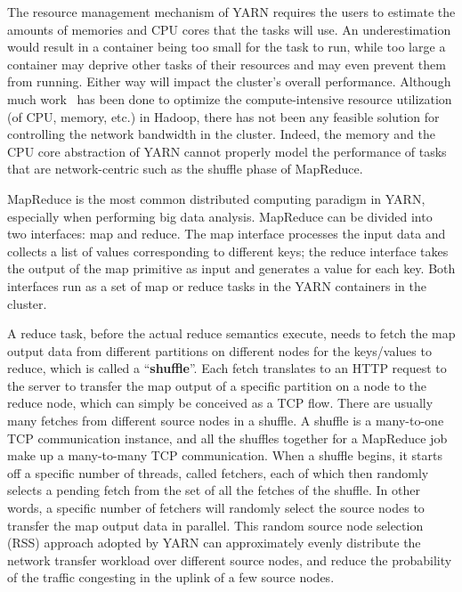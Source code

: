 \documentclass[10pt,journal,compsoc]{IEEEtran}
\begin{document}
The resource management mechanism of YARN requires the users to
estimate the amounts of memories and CPU cores that the tasks will use.
An underestimation would result in a container being too small for the task
to run, while too large a container may deprive other tasks of their
resources and may even prevent them from running. Either way
will impact the cluster's overall performance. 
Although much work~\cite{Delimitrou:2014:QRQ, smapreduce} has been done to optimize the compute-intensive
resource utilization (of CPU, memory, etc.) in
Hadoop, there has not been any
feasible solution for controlling the network bandwidth in the
cluster.
Indeed,
the memory and the CPU core abstraction of YARN cannot properly model the
performance of tasks that are network-centric such as
the shuffle phase of MapReduce. 
 
MapReduce is the most common distributed computing paradigm in YARN,
especially when performing big data analysis. MapReduce can be divided
into two interfaces: map and reduce.
The map interface processes the input data and collects a list of
values corresponding to different keys;
the reduce interface takes the output of the map primitive as
input and generates a value for each key.
Both interfaces run as a set of map or reduce tasks in the YARN
containers in the cluster.

A reduce task, before the actual reduce semantics execute,
needs to fetch the map output data from
different partitions on different nodes for the keys/values to reduce,
which is called a ``\textbf{shuffle}''.
Each fetch translates to an HTTP request to the server to transfer the
map output of a specific partition on a node to the reduce node,
which can simply be conceived as a TCP flow. 
There are usually many fetches from different source nodes in a shuffle. 
A shuffle is a many-to-one TCP communication instance, 
and all the shuffles together for a MapReduce job
make up a many-to-many TCP communication. 
When a shuffle begins, it starts off a specific number of threads, called
fetchers, each of which then randomly selects a pending fetch from the set
of all the fetches of the shuffle.
In other words, a specific number of fetchers will randomly select the
source nodes to transfer the map output data in parallel. 
This random source node selection (RSS) approach adopted by YARN can
approximately evenly distribute the network transfer workload
over different source nodes, and reduce the probability of the traffic
congesting in the uplink of a few source nodes.
\end{document}
